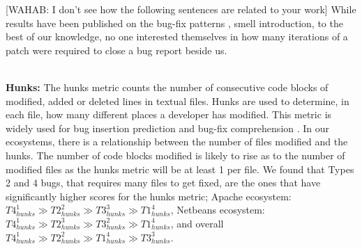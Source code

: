 [WAHAB:  I don't see how the following sentences are related to your work]
While results have been published on the bug-fix patterns \cite{Pan2008}, smell introduction\cite{Tufano2015, Eyolfson2011}, to the best of our knowledge, no one interested themselves in how many iterations of a patch were required to close a bug report beside us.

\\ \vspace{0.1cm} {\bf Hunks: } The hunks metric counts the number of consecutive code blocks of modified, added or deleted lines in textual files.
Hunks are used to determine, in each file, how many different places a developer has modified.
This metric is widely used for bug insertion prediction \cite{Kim2006,Jung2009, Rosen2015} and bug-fix comprehension \cite{Pan2008}.
In our ecosystems, there is a relationship between the number of files modified and the hunks.
The number of code blocks modified is likely to rise as to the number of modified files as the hunks metric will be at least 1 per file.
We found that Types 2 and 4 bugs, that requires many files to get fixed, are the ones that have significantly higher scores for the hunks metric; Apache ecosystem:
$
T4_{hunks}^1
 \gg
T2_{hunks}^2
 \gg
T3_{hunks}^3
 \gg
T1_{hunks}^4
$,
Netbeans ecosystem:
$
T4_{hunks}^1
 \gg
T2_{hunks}^3
 \gg
T3_{hunks}^2
 \gg
T1_{hunks}^4
$,
and overall
$
T4_{hunks}^1
 \gg
T2_{hunks}^2
 \gg
T1_{hunks}^4
 \gg
T3_{hunks}^3
$.

